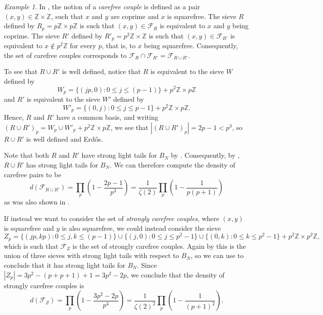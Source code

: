 \documentclass[a4paper,11pt,reqno]{amsart}
\theoremstyle{plain}
\theoremstyle{remark}
\newtheorem{example}[theorem]{Example}
\newcommand{\z}{\mathbb{Z}}
\newcommand{\cf}{\mathcal{F}}
\newcommand{\fr}{\mathcal{F}_R}
\newcommand{\frp}{\mathcal{F}_{R'}}
\begin{document}
			\begin{example}
				\label{ex: carefree couples}
				In \cite{Moree}, the notion of a \textit{carefree couple} is defined as a pair $(x,y) \in \z \times \z$, such that $x$ and $y$ are coprime and $x$ is squarefree. The sieve $R$ defined by $R_p = p\z\times p\z$ is such that $(x,y) \in \fr$ is equivalent to $x$ and $y$ being coprime. The sieve $R'$ defined by $R'_p = p^2\z \times \z$ is such that $(x,y) \in \frp$ is equivalent to $x \not \in p^2\z$ for every $p$, that is, to $x$ being squarefree. Consequently, the set of carefree couples corresponds to $\fr \cap \frp = \cf_{R \cup R'}$.
				
				To see that $R \cup R'$ is well defined, notice that $R$ is equivalent to the sieve $W$ defined by $$W_p = \{(jp,0):0 \leq j \leq (p-1)\}+p^2\z \times p\z$$ and $R'$ is equivalent to the sieve $W'$ defined by $$W'_p = \{(0,j): 0 \leq j \leq p-1\} + p^2\z\times p\z.$$ Hence, $R$ and $R'$ have a common basis, and writing $(R \cup R')_p = W_p \cup W'_p+ p^2\z\times p\z$, we see that $|(R \cup R')_p| = 2p-1< p^3$, so $R \cup R'$ is well defined and Erdős.
				
				Note that both $R$ and $R'$ have strong light tails for $B_N$ by  .  Consequently, by  , $R \cup R'$ has strong light tails for $B_N$. We can therefore compute the density of carefree pairs to be $$d(\cf_{R \cup R'}) = \prod_p\left(1-\frac{2p-1}{p^3}\right) = \frac{1}{\zeta(2)}\prod_p\left(1-\frac{1}{p(p+1)}\right) $$ as was also shown in  \cite{Moree}.
				
				If instead we want to consider the set of \textit{strongly carefree couples}, where $(x,y)$ is squarefree and $y$ is also squarefree, we could instead consider the sieve $$Z_p =  \{(jp,kp):0 \leq j,k \leq (p-1)\} \cup \{(j,0): 0 \leq j \leq p^2-1\} \cup \{(0,k): 0 \leq k \leq p^2-1\} + p^2\z \times p^2\z, $$ which is such that $\cf_Z$ is the set of strongly carefree couples. Again by  this is the union of three sieves with strong light tails with respect to $B_N$, so we can use   to conclude that it has strong light tails for $B_N$. Since $|Z_p| = 3p^2 -(p+p+1)+1 = 3p^2-2p$, we conclude that the density of strongly carefree couples is $$d(\cf_Z) = \prod_p \left(1-\frac{3p^2-2p}{p^4}\right) = \frac{1}{\zeta(2)^2}\prod_p\left(1-\frac{1}{(p+1)^2}\right).$$
			\end{example}
			
\end{document}
